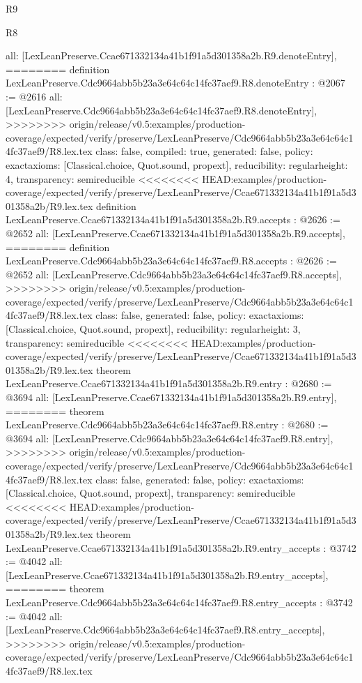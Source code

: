 \begin{lexlean}{R9}
\begin{lexlean}{R8}
\begin{coremodule}
{{{{{{{{{{{{{{{{{{{{{{{{{{{{{{{{{{{{  all: [LexLeanPreserve.Ccae671332134a41b1f91a5d301358a2b.R9.denoteEntry],
========
definition LexLeanPreserve.Cdc9664abb5b23a3e64c64c14fc37aef9.R8.denoteEntry : @2067 := @2616 {
  all: [LexLeanPreserve.Cdc9664abb5b23a3e64c64c14fc37aef9.R8.denoteEntry],
>>>>>>>> origin/release/v0.5:examples/production-coverage/expected/verify/preserve/LexLeanPreserve/Cdc9664abb5b23a3e64c64c14fc37aef9/R8.lex.tex
  class: false,
  compiled: true,
  generated: false,
  policy: exact{axioms: [Classical.choice, Quot.sound, propext]},
  reducibility: regular{height: 4},
  transparency: semireducible
}
<<<<<<<< HEAD:examples/production-coverage/expected/verify/preserve/LexLeanPreserve/Ccae671332134a41b1f91a5d301358a2b/R9.lex.tex
definition LexLeanPreserve.Ccae671332134a41b1f91a5d301358a2b.R9.accepts : @2626 := @2652 {
  all: [LexLeanPreserve.Ccae671332134a41b1f91a5d301358a2b.R9.accepts],
========
definition LexLeanPreserve.Cdc9664abb5b23a3e64c64c14fc37aef9.R8.accepts : @2626 := @2652 {
  all: [LexLeanPreserve.Cdc9664abb5b23a3e64c64c14fc37aef9.R8.accepts],
>>>>>>>> origin/release/v0.5:examples/production-coverage/expected/verify/preserve/LexLeanPreserve/Cdc9664abb5b23a3e64c64c14fc37aef9/R8.lex.tex
  class: false,
  generated: false,
  policy: exact{axioms: [Classical.choice, Quot.sound, propext]},
  reducibility: regular{height: 3},
  transparency: semireducible
}
<<<<<<<< HEAD:examples/production-coverage/expected/verify/preserve/LexLeanPreserve/Ccae671332134a41b1f91a5d301358a2b/R9.lex.tex
theorem LexLeanPreserve.Ccae671332134a41b1f91a5d301358a2b.R9.entry : @2680 := @3694 {
  all: [LexLeanPreserve.Ccae671332134a41b1f91a5d301358a2b.R9.entry],
========
theorem LexLeanPreserve.Cdc9664abb5b23a3e64c64c14fc37aef9.R8.entry : @2680 := @3694 {
  all: [LexLeanPreserve.Cdc9664abb5b23a3e64c64c14fc37aef9.R8.entry],
>>>>>>>> origin/release/v0.5:examples/production-coverage/expected/verify/preserve/LexLeanPreserve/Cdc9664abb5b23a3e64c64c14fc37aef9/R8.lex.tex
  class: false,
  generated: false,
  policy: exact{axioms: [Classical.choice, Quot.sound, propext]},
  transparency: semireducible
}
<<<<<<<< HEAD:examples/production-coverage/expected/verify/preserve/LexLeanPreserve/Ccae671332134a41b1f91a5d301358a2b/R9.lex.tex
theorem LexLeanPreserve.Ccae671332134a41b1f91a5d301358a2b.R9.entry_accepts : @3742 := @4042 {
  all: [LexLeanPreserve.Ccae671332134a41b1f91a5d301358a2b.R9.entry_accepts],
========
theorem LexLeanPreserve.Cdc9664abb5b23a3e64c64c14fc37aef9.R8.entry_accepts : @3742 := @4042 {
  all: [LexLeanPreserve.Cdc9664abb5b23a3e64c64c14fc37aef9.R8.entry_accepts],
>>>>>>>> origin/release/v0.5:examples/production-coverage/expected/verify/preserve/LexLeanPreserve/Cdc9664abb5b23a3e64c64c14fc37aef9/R8.lex.tex
}}}}}}}}}}}}}}}}}}}}}}}}}}}}}}}}}}}}}}}}
\end{coremodule}
\end{lexlean}
\end{lexlean}
